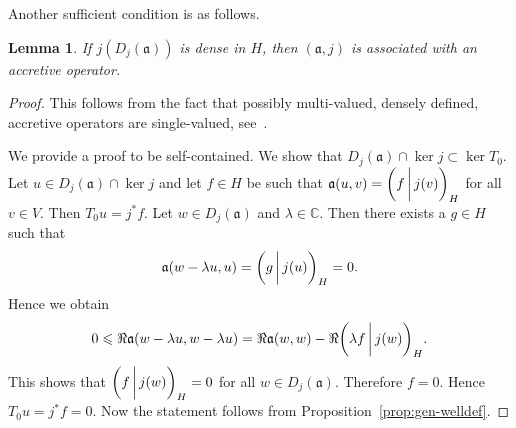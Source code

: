 \documentclass[a4paper,oneside,12pt]{amsart}
\theoremstyle{plain}
\newtheorem{lemma}[theorem]{Lemma}
\theoremstyle{definition}
\let\le=\leqslant
\begin{document}
Another sufficient condition is as follows.
\begin{lemma}\label{lem:dense-welldef}
If $j(D_j({{\mathfrak{{a}}}}))$ is dense in $H$, then $({{\mathfrak{{a}}}},j)$ is associated with an accretive operator.
\end{lemma}
\begin{proof}
This follows from the fact that possibly multi-valued, densely defined, accretive operators are single-valued, see~\cite[Remark~3.1.42]{HP97}.

We provide a proof to be self-contained.
We show that $D_j({{\mathfrak{{a}}}})\cap\ker j\subset\ker T_0$.
Let $u\in D_j({{\mathfrak{{a}}}})\cap\ker j$ and let $f\in H$ be such that
${{\mathfrak{{a}}}}(u,v)={{\ifthenelse{\equal{auto}{auto}}{\left({f}\mkern3mu{\biggm|}\mkern3mu {j(v)}\right)}{}
\ifthenelse{\equal{auto}{b}}{\bigl({f}\mkern3mu{\biggm|}\mkern3mu {j(v)}\bigr)}{}
\ifthenelse{\equal{auto}{B}}{\Bigl({f}\mkern3mu{\bigm|}\mkern3mu {j(v)}\Bigr)}{}
}}_H$ for all $v\in V$. Then $T_0u=j^*f$. Let $w\in D_j({{\mathfrak{{a}}}})$ and $\lambda\in{\mathbb{C}}$.
Then there exists a $g\in H$ such that
\[
    {{\mathfrak{{a}}}}(w-\lambda u,u) = {{\ifthenelse{\equal{auto}{auto}}{\left({g}\mkern3mu{\biggm|}\mkern3mu {j(u)}\right)}{}
\ifthenelse{\equal{auto}{b}}{\bigl({g}\mkern3mu{\biggm|}\mkern3mu {j(u)}\bigr)}{}
\ifthenelse{\equal{auto}{B}}{\Bigl({g}\mkern3mu{\bigm|}\mkern3mu {j(u)}\Bigr)}{}
}}_H = 0.
\]
Hence we obtain
\[
    0\le\Re{{\mathfrak{{a}}}}(w-\lambda u,w-\lambda u)=\Re{{\mathfrak{{a}}}}(w,w) -\Re{{\ifthenelse{\equal{auto}{auto}}{\left({\lambda f}\mkern3mu{\biggm|}\mkern3mu {j(w)}\right)}{}
\ifthenelse{\equal{auto}{b}}{\bigl({\lambda f}\mkern3mu{\biggm|}\mkern3mu {j(w)}\bigr)}{}
\ifthenelse{\equal{auto}{B}}{\Bigl({\lambda f}\mkern3mu{\bigm|}\mkern3mu {j(w)}\Bigr)}{}
}}_H.
\]
This shows that ${{\ifthenelse{\equal{auto}{auto}}{\left({f}\mkern3mu{\biggm|}\mkern3mu {j(w)}\right)}{}
\ifthenelse{\equal{auto}{b}}{\bigl({f}\mkern3mu{\biggm|}\mkern3mu {j(w)}\bigr)}{}
\ifthenelse{\equal{auto}{B}}{\Bigl({f}\mkern3mu{\bigm|}\mkern3mu {j(w)}\Bigr)}{}
}}_H=0$ for all $w\in D_j({{\mathfrak{{a}}}})$. Therefore $f=0$. 
Hence $T_0u = j^*f = 0$.
Now the statement follows from Proposition~\ref{prop:gen-welldef}.
\end{proof}
\end{document}
